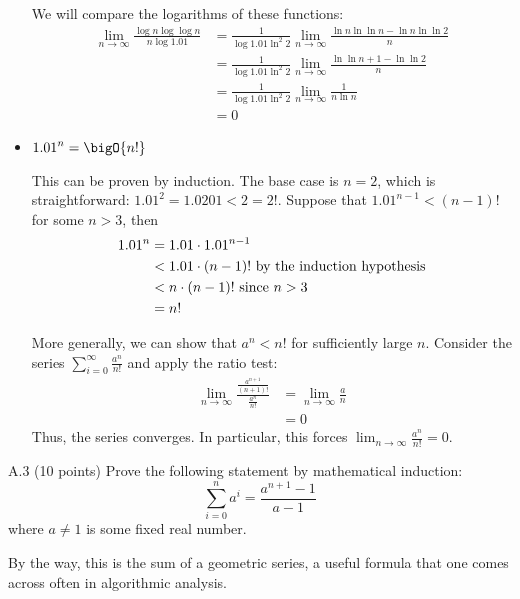 \documentclass[draft]{article}
\begin{document}
\begin{solution}
\begin{itemize}
              We will compare the logarithms of these functions:
              \begin{align*}\lim_{n\to\infty}\frac{\log{n}\log\log{n}}{n\log{1.01}}
                   & = \frac{1}{\log{1.01}\ln^2{2}}\lim_{n\to\infty}\frac{\ln{n}\ln\ln{n} - \ln{n}\ln\ln{2}}{n} \\
                   & = \frac{1}{\log{1.01}\ln^2{2}}\lim_{n\to\infty}\frac{\ln\ln{n} + 1 - \ln\ln{2}}{n}         \\
                   & = \frac{1}{\log{1.01}\ln^2{2}}\lim_{n\to\infty}\frac{1}{n\ln{n}}                           \\
                   & = 0
              \end{align*}

        \item $\displaystyle {1.01}^n = \bigO{n!}$

              This can be proven by induction. The base case is $n = 2$, which is straightforward: $1.01^2 = 1.0201 < 2 = 2!$. Suppose that ${1.01}^{n - 1} < (n - 1)!$ for some $n > 3$, then
              \begin{align*}{1.01}^n
                   & = 1.01 \cdot {1.01}^{n - 1}                               \\
                   & < 1.01 \cdot (n - 1)! \hbox{ by the induction hypothesis} \\
                   & < n \cdot (n - 1)! \hbox{ since $n > 3$}                  \\
                   & = n!
              \end{align*}

              More generally, we can show that $a^n < n!$ for sufficiently large $n$. Consider the series $\sum_{i=0}^{\infty}\frac{a^n}{n!}$ and apply the ratio test:
              \begin{align*}\lim_{n\to\infty}\frac{\frac{a^{n + 1}}{(n + 1)!}}{\frac{a^n}{n!}}
                   & = \lim_{n\to\infty}\frac{a}{n} \\
                   & = 0
              \end{align*}
              Thus, the series converges. In particular, this forces $\lim_{n\to\infty}\frac{a^n}{n!} = 0$.
    \end{itemize}
\end{solution}

\begin{exercise}{A.3} (10 points)
    Prove the following statement by mathematical induction:
    \[\sum_{i=0}^n a^i = \frac{a^{n+1} - 1}{a-1}\] where $a \neq 1$
    is some fixed real number.

    By the way, this is the sum of a geometric series, a useful
    formula that one comes across often in algorithmic analysis.
\end{exercise}
\end{document}
